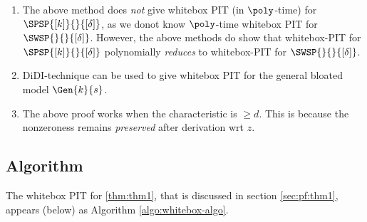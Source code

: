 \begin{remark*}
\begin{enumerate}
\setlength\itemsep{.1em}
    \item The above method does {\em not} give whitebox PIT (in $\poly$-time) for $\SPSP{[k]}{}{[\delta]}$, as we donot know $\poly$-time whitebox PIT for $\SWSP{}{}{[\delta]}$. However, the above methods do show that whitebox-PIT for $\SPSP{[k]}{}{[\delta]}$ polynomially \emph{reduces} to whitebox-PIT for $\SWSP{}{}{[\delta]}$.
    \item DiDI-technique can be used to give whitebox PIT for the general bloated model $\Gen{k}{s}$. 
    \item The above proof works when the characteristic is $\ge d$. This is because the nonzeroness remains \emph{preserved} after derivation wrt $z$.
\end{enumerate}
\end{remark*}

\subsection{Algorithm}

The whitebox PIT for \autoref{thm:thm1}, that is discussed in section \ref{sec:pf:thm1}, appears (below) as Algorithm \ref{algo:whitebox-algo}.

